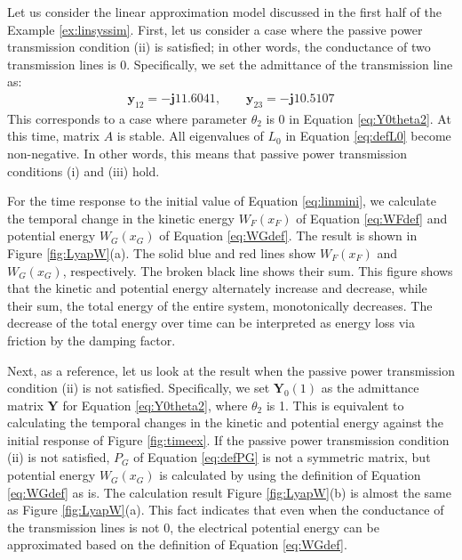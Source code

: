 \documentclass[graybox, envcountchap]{svmult}
\begin{document}
\begin{example}\label{ex:energylin}
Let us consider the linear approximation model discussed in the first half of the Example \ref{ex:linsyssim}.
First, let us consider a case where the passive power transmission condition (ii) is satisfied; in other words, the conductance of two transmission lines is 0.
Specifically, we set the admittance of the transmission line as:
\begin{align}\label{eq:bothlossless}
\bm{y}_{12} = - \bm{j} 11.6041, \qquad
\bm{y}_{23} =  - \bm{j} 10.5107
\end{align}
This corresponds to a case where parameter $\theta_2$ is 0 in Equation \ref{eq:Y0theta2}.
At this time, matrix $A$ is stable. All eigenvalues of $L_0$ in Equation \ref{eq:defL0} become non-negative.
In other words, this means that passive power transmission conditions (i) and (iii) hold. 

For the time response to the initial value of Equation \ref{eq:linmini}, we calculate the temporal change in the kinetic energy $W_F(x_F)$ of Equation \ref{eq:WFdef} and potential energy $W_G(x_G)$ of Equation \ref{eq:WGdef}.
The result is shown in Figure \ref{fig:LyapW}(a). The solid blue and red lines show $W_F(x_F)$ and $W_G(x_G)$, respectively.
The broken black line shows their sum. This figure shows that the kinetic and potential energy alternately increase and decrease, while their sum, the total energy of the entire system, monotonically decreases. 
The decrease of the total energy over time can be interpreted as energy loss via friction by the damping factor.

Next, as a reference, let us look at the result when the passive power transmission condition (ii) is not satisfied.
Specifically, we set $\bm{Y}_0(1)$ as the admittance matrix $\bm{Y}$ for Equation \ref{eq:Y0theta2}, where $\theta_2$ is 1.
This is equivalent to calculating the temporal changes in the kinetic and potential energy against the initial response of Figure \ref{fig:timeex}.
If the passive power transmission condition (ii) is not satisfied, $P_G$ of Equation \ref{eq:defPG} is not a symmetric matrix, but potential energy $W_G(x_G)$ is calculated by using the definition of Equation \ref{eq:WGdef} as is.
The calculation result Figure \ref{fig:LyapW}(b) is almost the same as Figure \ref{fig:LyapW}(a).
This fact indicates that even when the conductance of the transmission lines is not 0, the electrical potential energy can be approximated based on the definition of Equation \ref{eq:WGdef}.
\end{example}
\end{document}
